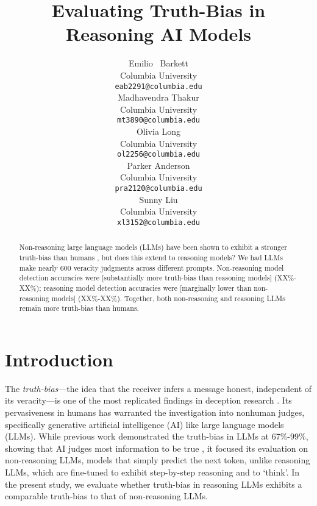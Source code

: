 \documentclass{article}
\title{Evaluating Truth-Bias in Reasoning AI Models}
\author{%
  Emilio ~Barkett\\
  Columbia University\\
  \texttt{eab2291@columbia.edu} \\
   \And
   Madhavendra Thakur \\
   Columbia University \\
   \texttt{mt3890@columbia.edu} \\
   \AND
   Olivia Long \\
   Columbia University \\
   \texttt{ol2256@columbia.edu} \\
   \And
   Parker Anderson \\
   Columbia University \\
   \texttt{pra2120@columbia.edu} \\
   \And
   Sunny Liu \\
   Columbia University \\
   \texttt{xl3152@columbia.edu} \\
}
\begin{document}
\maketitle


\begin{abstract}
  Non-reasoning large language models (LLMs) have been shown to exhibit a stronger truth-bias than humans \citep{markowitz_generative_2024}, but does this extend to reasoning models? We had LLMs make nearly 600 veracity judgments across different prompts. Non-reasoning model detection accuracies were [substantially more truth-bias than reasoning models] (XX\%-XX\%); reasoning model detection accuracies were [marginally lower than non-reasoning models] (XX\%-XX\%). Together, both non-reasoning and reasoning LLMs remain more truth-bias than humans.
\end{abstract}

\section{Introduction}


The \textit{truth-bias}---the idea that the receiver infers a message honest, independent of its veracity---is one of the most replicated findings in deception research \citep{levine_duped_2020, levine_truth-default_2014}. Its pervasiveness in humans has warranted the investigation into nonhuman judges, specifically generative artificial intelligence (AI) like large language models (LLMs). While previous work demonstrated the truth-bias in LLMs at 67\%-99\%, showing that AI judges most information to be true \citep{markowitz_generative_2024}, it focused its evaluation on non-reasoning LLMs, models that simply predict the next token, unlike reasoning LLMs, which are fine-tuned to exhibit step-by-step reasoning and to `think'. In the present study, we evaluate whether truth-bias in reasoning LLMs exhibits a comparable truth-bias to that of non-reasoning LLMs.
\end{document}
